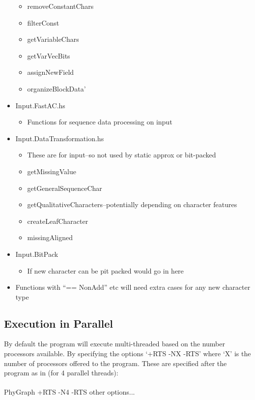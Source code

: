 \documentclass[11pt]{article}
\begin{document}
\begin{itemize}
			 \begin{itemize}
			 	\item{removeConstantChars}
			 	\item{filterConst}
			 	\item{getVariableChars}
			 	\item{getVarVecBits}
			 	\item{assignNewField}
			 	\item{organizeBlockData'}
			 \end{itemize}
		 	  \item{Input.FastAC.hs}
		 	 \begin{itemize}
		 	 	\item{Functions for sequence data processing on input}
		 	 \end{itemize}
		 	 \item{Input.DataTransformation.hs}
		 	 \begin{itemize}
		 	 	\item{These are for input--so not used by static approx or bit-packed}
		 	 	\item{getMissingValue}
		 	 	\item{getGeneralSequenceChar}
		 	 	\item{getQualitativeCharacters--potentially depending on character features}
		 	 	\item{createLeafCharacter}
		 	 	\item{missingAligned}
		 	 \end{itemize}
	 	 	 \item{Input.BitPack}
	 	 	 \begin{itemize}
	 	 	 	\item{If new character can be pit packed would go in here}
	 	 	 \end{itemize}
		 	 
			 \item{Functions with ``== NonAdd'' etc will need extra cases for any new character type}
	\end{itemize}
	\subsection{Execution in Parallel}
	By default the program will execute multi-threaded based on the number processors available.  By specifying the options `+RTS -NX -RTS' where `X' is the number of processors offered to the program. These are specified after the program as in (for 4 parallel threads):\\
	\\
	PhyGraph +RTS -N4 -RTS other options...  \\
	
\end{document}

